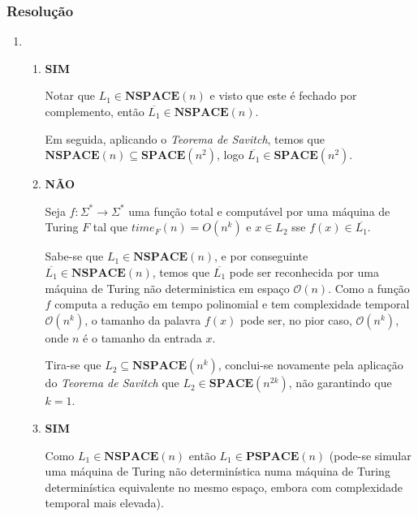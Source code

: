 \documentclass[a4paper,12pt]{article}
\begin{document}
\subsubsection*{Resolução}
\begin{enumerate}[label=\alph*)]
  \item
  \begin{enumerate}[label=\roman*)]
    \item
    \textbf{SIM}

    \vspace{0.3cm}
    Notar que $L_1 \in \textbf{NSPACE}(n)$ e visto que este é fechado por complemento, então $\overline{L_1} \in \textbf{NSPACE}(n)$.
    
    \vspace{0.3cm}
    Em seguida, aplicando o \textit{Teorema de Savitch}, temos que $\textbf{NSPACE}(n) \subseteq \textbf{SPACE}(n^2)$, logo $\overline{L_1} \in \textbf{SPACE}(n^2)$.

    \vspace{0.5cm}
    \item
    \textbf{NÃO}

    \vspace{0.3cm}
    Seja $f: \Sigma^* \to \Sigma^*$ uma função total e computável por uma máquina de Turing $F$ tal que $time_F(n) = O(n^k)$ e $x \in L_2$ sse $f(x) \in \overline{L_1}$.

    \vspace{0.3cm}
    Sabe-se que $L_1 \in \textbf{NSPACE}(n)$, e por conseguinte $\overline{L_1} \in \textbf{NSPACE}(n)$, temos que $\overline{L_1}$ pode ser reconhecida por uma máquina de Turing não deterministica em espaço $\mathcal{O}(n)$.
    Como a função $f$ computa a redução em tempo polinomial e tem complexidade temporal $\mathcal{O}(n^k)$, o tamanho da palavra $f(x)$ pode ser, no pior caso, $\mathcal{O}(n^k)$, onde $n$ é o tamanho da entrada $x$.

    \vspace{0.3cm}
    Tira-se que $L_2 \subseteq \textbf{NSPACE}(n^k)$, conclui-se novamente pela aplicação do \textit{Teorema de Savitch} que $L_2 \in \textbf{SPACE}(n^{2k})$, não garantindo que $k=1$.
    
    \vspace{0.5cm}
    \item
    \textbf{SIM}

    \vspace{0.3cm}
    Como $L_1 \in \textbf{NSPACE}(n)$ então $L_1 \in \textbf{PSPACE}(n)$ (pode-se simular uma máquina de Turing não determinística numa máquina de Turing determinística equivalente no mesmo espaço, embora com complexidade temporal mais elevada).
    

\end{enumerate}
\end{enumerate}
\end{document}
